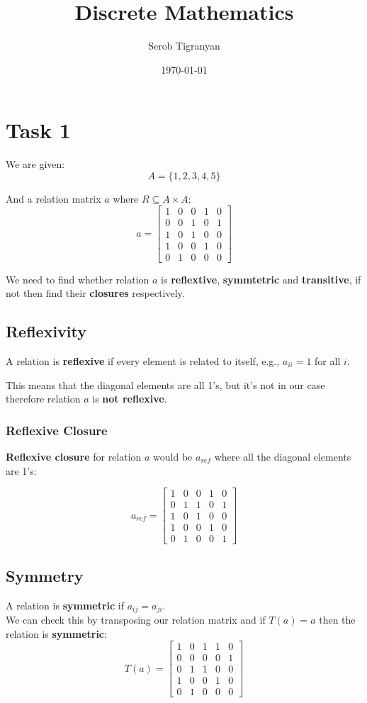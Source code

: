 \documentclass[11pt]{article}
\author{Serob Tigranyan}
\date{\today}
\title{Discrete Mathematics}
\begin{document}
\maketitle
\tableofcontents

\newpage
\section{Task 1}
\label{sec:orgf3b1811}
We are given:
\[
A = \{ 1, 2, 3, 4, 5 \}
\]

And a relation matrix \(a\) where \(R \subseteq A \times A\):
\[
a =
 \begin{bmatrix}
 1 & 0 & 0 & 1 & 0 \\
 0 & 0 & 1 & 0 & 1 \\
 1 & 0 & 1 & 0 & 0 \\
 1 & 0 & 0 & 1 & 0 \\
 0 & 1 & 0 & 0 & 0
 \end{bmatrix}
\]

We need to find whether relation \(a\) is \textbf{reflextive}, \textbf{symmtetric} and \textbf{transitive}, if not then find their \textbf{closures} respectively.
\subsection{Reflexivity}
\label{sec:org9da59d8}
A relation is \textbf{reflexive} if every element is related to itself, e.g., \(a_{ii} = 1\) for all \(i\).

This means that the diagonal elements are all 1's, but it's not in our case therefore relation \(a\) is \textbf{not reflexive}.
\subsubsection{Reflexive Closure}
\label{sec:org2f1e6bd}
\textbf{Reflexive closure} for relation \(a\) would be \(a_{ref}\) where all the diagonal elements are 1's:

\[
a_{ref} =
 \begin{bmatrix}
 1 & 0 & 0 & 1 & 0 \\
 0 & 1 & 1 & 0 & 1 \\
 1 & 0 & 1 & 0 & 0 \\
 1 & 0 & 0 & 1 & 0 \\
 0 & 1 & 0 & 0 & 1
 \end{bmatrix}
\]
\subsection{Symmetry}
\label{sec:org07b5d17}
A relation is \textbf{symmetric} if \(a_{ij} = a_{ji}\). \\
We can check this by transposing our relation matrix and if \(T(a) = a\) then the relation is \textbf{symmetric}:
\[
T(a) =
 \begin{bmatrix}
 1 & 0 & 1 & 1 & 0 \\
 0 & 0 & 0 & 0 & 1 \\
 0 & 1 & 1 & 0 & 0 \\
 1 & 0 & 0 & 1 & 0 \\
 0 & 1 & 0 & 0 & 0
 \end{bmatrix}
\]
\end{document}
